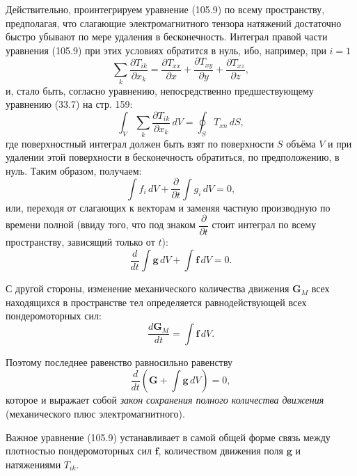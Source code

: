 \documentclass[a4paper,10pt]{article}
\begin{document}
Действительно, проинтегрируем уравнение (105.9) по всему пространству,
предполагая, что слагающие электромагнитного тензора натяжений достаточно
быстро убывают по мере удаления в бесконечность. Интеграл правой части
уравнения (105.9) при этих условиях
обратится в нуль, ибо, например, при $i = 1$
$$
    \sum_k\frac{\partial T_{ik}}{\partial x_k}
    = \frac{\partial T_{xx}}{\partial x}
    + \frac{\partial T_{xy}}{\partial y}
    + \frac{\partial T_{xz}}{\partial z},
$$
и, стало быть, согласно уравнению, непосредственно предшествующему
уравнению (33.7) на стр. 159:
$$
    \int_V\sum_k\frac{\partial T_{ik}}{\partial x_k}\,dV
    = \oint_S T_{xn}\,dS,
$$
где поверхностный интеграл должен быть взят по поверхности $S$ объёма
$V$ и при удалении этой поверхности в бесконечность обратиться, по
предположению, в нуль. Таким образом, получаем:
$$
    \int f_i\,dV + \frac{\partial}{\partial t}\int g_i\,dV = 0,
$$
или, переходя от слагающих к векторам и заменяя частную производную
по времени полной (ввиду того, что под знаком $\dfrac{\partial}{\partial t}$
стоит интеграл по всему пространству, зависящий только от $t$):
$$
    \frac{d}{dt}\int\mathbf{g}\,dV + \int\mathbf{f}\,dV = 0.
$$

С другой стороны, изменение механического количества движения
$\mathbf{G}_M$ всех находящихся в пространстве тел определяется
равнодействующей всех пондеромоторных сил:
$$
    \frac{d\mathbf{G}_M}{dt} = \int\mathbf{f}\,dV.
$$

Поэтому последнее равенство равносильно равенству
\begin{equation}
    \frac{d}{dt}\!\left(\mathbf{G} + \int\mathbf{g}\,dV\right) = 0,
    \tag{105.10}
\end{equation}
которое и выражает собой \textit{закон сохранения полного количества
движения} (механического плюс электромагнитного).

Важное уравнение (105.9) устанавливает в самой общей форме связь
между плотностью пондеромоторных сил $\mathbf{f}$, количеством движения
поля $\mathbf{g}$ и натяжениями $T_{ik}$.


\end{document}
